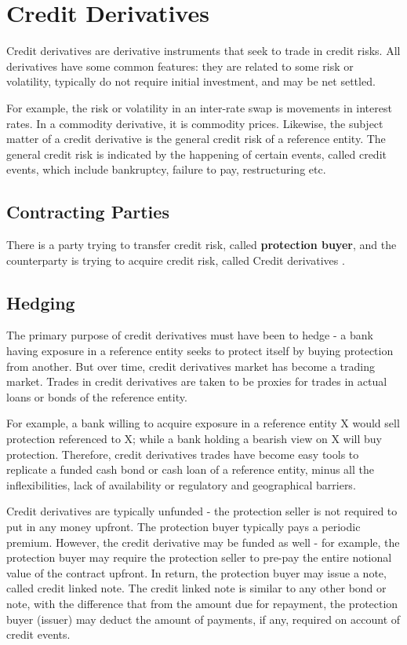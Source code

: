 \documentclass[]{article}
\begin{document}
\section{Credit Derivatives }

Credit derivatives are derivative instruments that seek to trade in credit risks. All derivatives have some common features: they are related to some risk or volatility, typically do not require initial investment, and may be net settled. 

For example, the risk or volatility in an inter-rate swap is movements in interest rates. In a commodity derivative, it is commodity prices. Likewise, the subject matter of a credit derivative is the general credit risk of a reference entity. The general credit risk is indicated by the happening of certain events, called credit events, which include bankruptcy, failure to pay, restructuring etc.

\subsection{Contracting Parties}There is a party trying to transfer credit risk, called \textbf{protection buyer}, and the counterparty is trying to acquire credit risk, called Credit derivatives .

\subsection{Hedging}
The primary purpose of credit derivatives must have been to hedge - a bank having exposure in a reference entity seeks to protect itself by buying protection from another. But over time, credit derivatives market has become a trading market. Trades in credit derivatives are taken to be proxies for trades in actual loans or bonds of the reference entity. 


For example, a bank willing to acquire exposure in a reference entity X would sell protection referenced to X; while a bank holding a bearish view on X will buy protection. Therefore, credit derivatives trades have become easy tools to replicate a funded cash bond or cash loan of a reference entity, minus all the inflexibilities, lack of availability or regulatory and geographical barriers.

Credit derivatives are typically unfunded - the protection seller is not required to put in any money upfront. The protection buyer typically pays a periodic premium. However, the credit derivative may be funded as well - for example, the protection buyer may require the protection seller to pre-pay the entire notional value of the contract upfront. In return, the protection buyer may issue a note, called credit linked note. The credit linked note is similar to any other bond or note, with the difference that from the amount due for repayment, the protection buyer (issuer) may deduct the amount of payments, if any, required on account of credit events.
\end{document}
